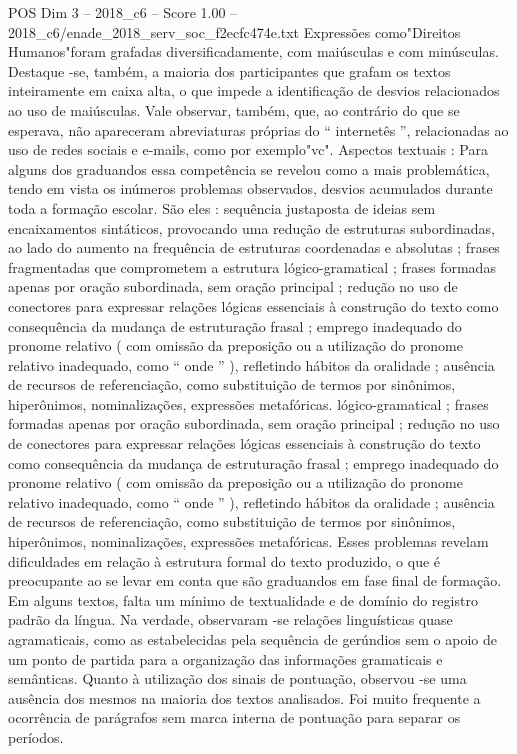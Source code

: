 \begin{textsample}{POS Dim 3 – 2018\_c6 – Score 1.00 – 2018\_c6/enade\_2018\_serv\_soc\_f2ecfc474e.txt}
Expressões como"Direitos Humanos"foram grafadas diversificadamente, com maiúsculas e com minúsculas.
Destaque -se, também, a maioria dos participantes que grafam os textos inteiramente em caixa alta, o que impede a identificação de desvios relacionados ao uso de maiúsculas.
Vale observar, também, que, ao contrário do que se esperava, não apareceram abreviaturas próprias do “ internetês ”, relacionadas ao uso de redes sociais e e-mails, como por exemplo"vc".
Aspectos textuais : Para alguns dos graduandos essa competência se revelou como a mais problemática, tendo em vista os inúmeros problemas observados, desvios acumulados durante toda a formação escolar.
São eles : sequência justaposta de ideias sem encaixamentos sintáticos, provocando uma redução de estruturas subordinadas, ao lado do aumento na frequência de estruturas coordenadas e absolutas ; frases fragmentadas que comprometem a estrutura lógico-gramatical ; frases formadas apenas por oração subordinada, sem oração principal ; redução no uso de conectores para expressar relações lógicas essenciais à construção do texto como consequência da mudança de estruturação frasal ; emprego inadequado do pronome relativo ( com omissão da preposição ou a utilização do pronome relativo inadequado, como “ onde ” ), refletindo hábitos da oralidade ; ausência de recursos de referenciação, como substituição de termos por sinônimos, hiperônimos, nominalizações, expressões metafóricas. lógico-gramatical ; frases formadas apenas por oração subordinada, sem oração principal ; redução no uso de conectores para expressar relações lógicas essenciais à construção do texto como consequência da mudança de estruturação frasal ; emprego inadequado do pronome relativo ( com omissão da preposição ou a utilização do pronome relativo inadequado, como “ onde ” ), refletindo hábitos da oralidade ; ausência de recursos de referenciação, como substituição de termos por sinônimos, hiperônimos, nominalizações, expressões metafóricas.
Esses problemas revelam dificuldades em relação à estrutura formal do texto produzido, o que é preocupante ao se levar em conta que são graduandos em fase final de formação.
Em alguns textos, falta um mínimo de textualidade e de domínio do registro padrão da língua.
Na verdade, observaram -se relações linguísticas quase agramaticais, como as estabelecidas pela sequência de gerúndios sem o apoio de um ponto de partida para a organização das informações gramaticais e semânticas.
Quanto à utilização dos sinais de pontuação, observou -se uma ausência dos mesmos na maioria dos textos analisados.
Foi muito frequente a ocorrência de parágrafos sem marca interna de pontuação para separar os períodos.

\end{textsample}
